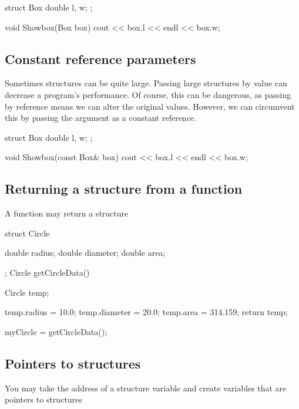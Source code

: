 \documentclass{report}
\begin{document}
	\begin{cppcode}
struct Box {
    double l, w;
};

void Showbox(Box box) {
    cout << box.l << endl << box.w;
}
	\end{cppcode}
	
	
	\bigbreak \noindent 
	\bigbreak \noindent 

	\pagebreak
	\subsection{Constant reference parameters}
	\bigbreak \noindent 
	\begin{concept}
	   Sometimes structures can be quite large. Passing large structures by value can decrease a program's performance. Of course, this can be dangerous, as passing by reference means we can alter the original values. However, we can circumvent this by passing the argument as a constant reference.
	\end{concept}
	\bigbreak \noindent 
	
	\begin{cppcode}
struct Box {
    double l, w;
};

void Showbox(const Box& box) {
    cout << box.l << endl << box.w;
}
	\end{cppcode}
	

	\bigbreak \noindent 
	\subsection{Returning a structure from a function}
	\bigbreak \noindent 
	\begin{concept}
	   A function may return a structure 
	\end{concept}
	\bigbreak \noindent 
	
	\begin{cppcode}
struct Circle {
    double radius;
    double diameter;
    double area;

};
Circle getCircleData() {
    Circle temp;

    temp.radius = 10.0;
    temp.diameter = 20.0;
    temp.area = 314.159;
    return temp;
}
myCircle = getCircleData();
	\end{cppcode}
	

	\pagebreak
	\subsection{Pointers to structures}
	\bigbreak \noindent 
	\begin{concept}
	   You may take the address of a structure variable and create variables that are pointers to structures 
	\end{concept}
	\bigbreak \noindent 
	
\end{document}
